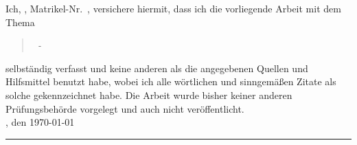 
Ich, \autor, Matrikel-Nr.\ \matrikelnr, versichere hiermit, dass ich die vorliegende Arbeit mit dem Thema
\begin{quote}
\textit{\titel\ - \untertitel}
\end{quote}
selbständig verfasst und keine anderen als die angegebenen Quellen und Hilfsmittel benutzt habe, wobei ich alle wörtlichen und sinngemäßen Zitate als solche gekennzeichnet habe. Die Arbeit wurde bisher keiner anderen Prüfungsbehörde vorgelegt und auch nicht veröffentlicht.\\

\ort, den \today
\vspace*{1cm}\\
\rule[-0.1cm]{5cm}{0.5pt}\\
\textsc{\autor} 

